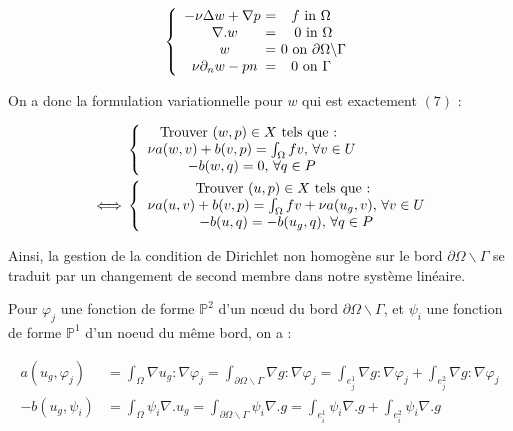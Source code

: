 \documentclass[a4paper,12pt]{article}
\begin{document}
\begin{equation*}
\left \{
\begin{array}{c @{ = } c}
    -\nu \Delta w + \nabla p \text{ } & f \text{ in } \Omega\\
    \nabla . w & \text{ } 0 \text{ in } \Omega\\
    w & \text{ } 0 \text{ on } \partial\Omega \backslash \Gamma\\
    \nu\partial_{n}w - pn & 0 \text{ on } \Gamma\\
\end{array}
\right.
\end{equation*}

On a donc la formulation variationnelle pour $w$ qui est exactement $(7)$ :

\begin{equation*}
\begin{split}
& \left \{
\begin{array}{c @{} c}
\text{Trouver } (w,p) \in X \text{ tels que : } \\
\nu a(w,v) + b(v,p) = \int_{\Omega} fv \text{, } \forall v \in U \\
-b(w,q) = 0 \text{, } \forall q \in P\\
\end{array}
\right. \\
\iff & \left \{
\begin{array}{c @{} c}
\text{Trouver } (u,p) \in X \text{ tels que : } \\
\nu a(u,v) + b(v,p) = \int_{\Omega} fv + \nu a(u_g,v) \text{, } \forall v \in U \\
-b(u,q) = -b(u_g,q) \text{, } \forall q \in P\\
\end{array}
\right.
\end{split}
\end{equation*}

Ainsi, la gestion de la condition de Dirichlet non homogène sur le bord $\partial \Omega \backslash \Gamma$ se traduit par un changement de second membre dans notre système linéaire.

Pour $\varphi_j$ une fonction de forme $\mathbb{P}^2$ d'un nœud du bord $\partial \Omega \backslash \Gamma$, et $\psi_i$ une fonction de forme $\mathbb{P}^{1}$ d'un noeud du même bord, on a :

\begin{equation*}
\begin{split}
a(u_g,\varphi_j) & = \int_\Omega \nabla u_g : \nabla \varphi_j = \int_{\partial \Omega \backslash \Gamma} \nabla g : \nabla \varphi_j = \int_{e^{1}_j} \nabla g : \nabla \varphi_j + \int_{e^{2}_j} \nabla g : \nabla \varphi_j \\
-b(u_g,\psi_i) & = \int_\Omega \psi_i \nabla . u_g = \int_{\partial \Omega \backslash \Gamma} \psi_i \nabla . g = \int_{e^{1}_i} \psi_i \nabla . g + \int_{e^{2}_i} \psi_i \nabla . g
\end{split}
\end{equation*}
\end{document}
